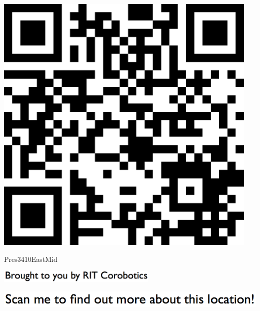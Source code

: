 \documentclass[letterpaper]{article}
\begin{document}
 \begingroup 
 \centerline{\includegraphics[scale=1,width=5in,height=5in]{Pres3410EastMid.png}} 
 \endgroup 
 \vspace*{\fill} 

 \hfill{\small Pres3410EastMid} 

  \vspace{0.7in} 
 
 \centerline{\includegraphics[scale=1,width=3in]{text-bottom.png}} 
 
 \pagebreak 
{} 
 \vspace*{\fill} 
 
  \centerline{\includegraphics[scale=1,width=6in]{text-top.png}} 
 
 \vspace{0.5in} 
 
\end{document}

